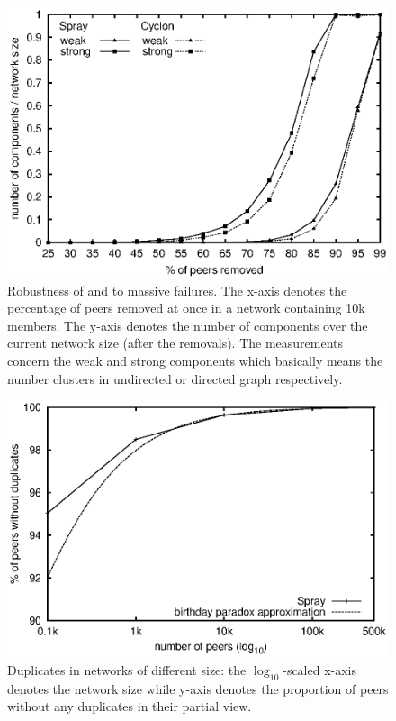 \begin{figure}
  \centering
  \includegraphics[width=\textwidth]{img/spray/resilience.eps}
  \caption{\label{fig:resilience}Robustness of \CYCLON and \SPRAY to massive
    failures. The x-axis denotes the percentage of peers removed at once in a
    network containing 10k members. The y-axis denotes the number of
    components over the current network size (after the removals). The
    measurements concern the weak and strong components which basically means
    the number clusters in undirected or directed graph respectively.}
\end{figure}


\begin{figure}
  \centering
  \includegraphics[width=\textwidth]{img/spray/duplicates.eps}
  \caption{\label{fig:duplicates}Duplicates in networks of different size: the
    $\log_{10}$-scaled x-axis denotes the network size while y-axis denotes the
    proportion of peers without any duplicates in their partial view.}
\end{figure}

